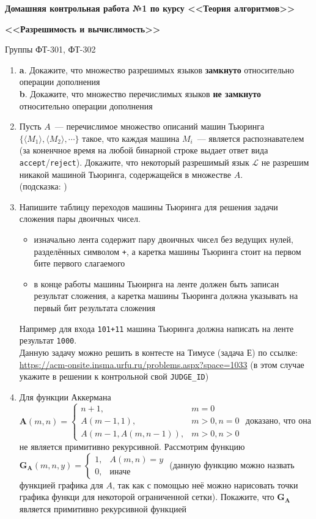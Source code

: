 \documentclass[
    11pt,
    a4paper
]{article}
\theoremstyle{definition}
\begin{document}
\centerline{\Large \bf Домашняя контрольная работа №1 по курсу <<Теория алгоритмов>>}
\centerline{\Large \bf <<Разрешимость и вычислимость>>}
\centerline{Группы ФТ-301, ФТ-302}

\begin{enumerate}
\item 
	\textbf{a}. Докажите, что множество разрешимых языков \textbf{замкнуто} относительно операции дополнения\\
	\textbf{b}. Докажите, что множество перечислимых языков \textbf{не замкнуто} относительно операции дополнения
	
\item Пусть $A$~--- перечислимое множество описаний машин Тьюринга $\{ \langle M_1 \rangle, \langle M_2 \rangle, \cdots \}$ такое, что каждая машина $M_i$~--- является распознавателем (за коненчное время на любой бинарной строке выдает ответ вида \texttt{accept}/\texttt{reject}). Докажите, что некоторый разрешимый язык $\mathcal{L}$ не разрешим никакой машиной Тьюринга, содержащейся в множестве $A$.\\
(подсказка: {})

\item Напишите таблицу переходов машины Тьюринга для решения задачи сложения пары двоичных чисел. 
\begin{itemize}
\item изначально лента содержит пару двоичных чисел без ведущих нулей, разделённых символом \texttt{+}, а каретка машины Тьюринга стоит на первом бите первого слагаемого
\item в конце работы машины Тьюирнга на ленте должен быть записан результат сложения, а каретка машины Тьюринга должна указывать на первый бит результата сложения
\end{itemize}
Например для входа \texttt{101+11} машина Тьюринга должна написать на ленте результат \texttt{1000}.\\
Данную задачу можно решить в контесте на Тимусе (задача Е) по ссылке: \url{https://acm-onsite.insma.urfu.ru/problems.aspx?space=1033} (в этом случае укажите в решении к контрольной свой \texttt{JUDGE\_ID})

\item Для функции Аккермана $\mathbf{A}(m, n) = \begin{cases}n + 1,& m = 0\\A(m - 1, 1), & m > 0, n = 0\\A(m - 1, A(m, n - 1)), & m > 0, n > 0\end{cases}$ доказано, что она не является примитивно рекурсивной. Рассмотрим функцию $\mathbf{G_A}(m, n, y) = \begin{cases}1, & A(m, n) = y\\0, & \text{иначе}\end{cases}$ (данную функцию можно назвать функцией графика для $A$, так как с помощью неё можно нарисовать точки графика функци для некоторой ограниченной сетки). Покажите, что $\mathbf{G_A}$ является примитивно рекурсивной функцией


\end{enumerate}
\end{document}
